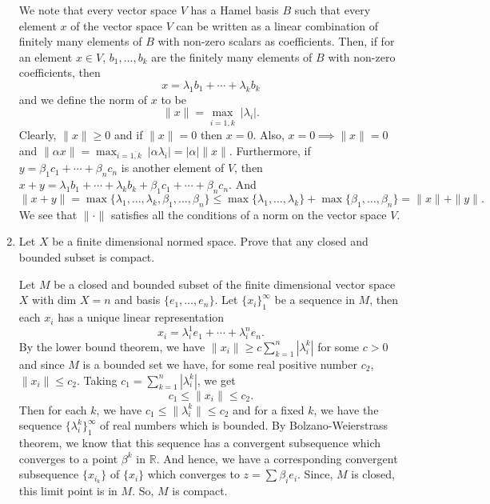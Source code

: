 \documentclass[12pt]{article}
\newcommand{\rl}{\mathbb{R}}
\begin{document}
\begin{enumerate}
\begin{mybox}
    We note that every vector space $V$ has a Hamel basis
    $B$ such that every element $x$ of the vector space
    $V$ can be written as a linear combination of finitely
    many elements of $B$ with non-zero scalars
    as coefficients. Then, if for an element $x\in V$,
    $b_1,\ldots, b_k$ are the finitely many elements
    of $B$ with non-zero coefficients, then
    $$x=\lambda_1 b_1+\cdots+\lambda_k b_k$$
    and we define the norm of $x$ to be
    $$\|x\|=\max_{i=\overline{1, k}}\ |\lambda_i|.$$
    Clearly, $\|x\|\geq 0$ and if $\|x\|=0$ then
    $x=0$. Also, $x=0\implies \|x\|=0$ and $\|\alpha x\|
    =\max_{i=\overline{1, k}}\ |\alpha\lambda_i|
    =|\alpha|\|x\|$. Furthermore, if $y=\beta_1 c_1+
    \cdots +\beta_n c_n$ is another element of $V$,
    then $x+y=\lambda_1 b_1+\cdots+\lambda_k b_k+
    \beta_1 c_1+\cdots +\beta_n c_n$. And
    $$\|x+y\|=\max\{\lambda_1,\ldots,\lambda_k,\beta_1,
    \ldots,\beta_n\}\leq \max\{\lambda_1,\ldots,\lambda_k\}
    +\max\{\beta_1,\ldots,\beta_n\}=\|x\|+\|y\|.$$
    We see that $\|\cdot\|$ satisfies all the conditions
    of a norm on the vector space $V$.
\end{mybox}
 
\item Let $X$ be a finite dimensional normed space.
    Prove that any closed and bounded subset is compact.
\begin{mybox}

    Let $M$ be a closed and bounded subset of the
    finite dimensional vector space $X$ with dim $X=n$
    and basis $\{e_1,\ldots,e_n\}$. Let $\{x_i\}_1^\infty$
    be a sequence in $M$, then each $x_i$ has a unique
    linear representation
    $$x_i=\lambda_i^1 e_1+\cdots+\lambda_i^n e_n.$$
    By the lower bound theorem, we have
    $\|x_i\|\geq c\sum_{k=1}^n{|\lambda_i^k|}$ for some
    $c>0$ and since
    $M$ is a bounded set we have, for some real positive
    number $c_2$, $\|x_i\|\leq c_2$. Taking
    $c_1=\sum_{k=1}^n{|\lambda_i^k|}$, we get
    $$c_1\leq\|x_i\|\leq c_2.$$
    Then for each $k$, we have
    $c_1\leq\|\lambda_i^k\|\leq c_2$
    and for a fixed $k$, we have the sequence
    $\{\lambda_i^k\}_1^\infty$ of real numbers
    which is bounded. By Bolzano-Weierstrass theorem,
    we know that this sequence has a convergent
    subsequence which converges to a point $\beta^k$ in
    $\rl$. And hence, we have a corresponding
    convergent subsequence $\{x_{i_k}\}$ of $\{x_i\}$
    which converges to $z=\sum{\beta_i e_i}$. Since, $M$
    is closed, this limit point is in $M$. So, $M$ is compact.


\end{mybox}
\end{enumerate}
\end{document}
